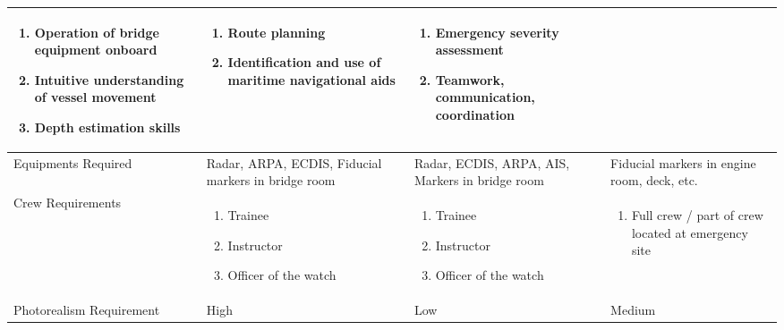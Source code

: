 \begin{table}[h]
\begin{tabular}{@{}p{2.2cm}|p{3.8cm}p{3.2cm}p{3.2cm}@{}}
\begin{enumerate}[nosep,leftmargin=*,topsep=0pt,partopsep=0pt,align=left,itemsep=0cm]
\item Operation of bridge equipment onboard
\item Intuitive understanding of vessel movement
\item Depth estimation skills 
\end{enumerate}
\vspace{-\baselineskip}
& \vspace{-2mm}\begin{enumerate}[nosep,leftmargin=*,topsep=0pt,partopsep=0pt,align=left,itemsep=0cm]
\item Route planning
\item Identification and use of maritime navigational aids
\end{enumerate}
& \vspace{-2mm}\begin{enumerate}[nosep,leftmargin=*,topsep=0pt,partopsep=0pt,align=left,itemsep=0cm]
\item Emergency severity assessment 
\item Teamwork, communication, coordination 
\end{enumerate} \vspace{-\baselineskip} \\
\hline
Equipments Required & Radar, ARPA, ECDIS, Fiducial markers in bridge room & Radar, ECDIS, ARPA, AIS, Markers in bridge room & Fiducial markers in engine room, deck, etc. \\
\hline
Crew Requirements & 
\vspace{-2mm} \begin{enumerate}[nosep,leftmargin=*,topsep=0pt,partopsep=0pt,align=left,itemsep=0cm]
\item Trainee 
\item Instructor
\item Officer of the watch
\end{enumerate}
&\vspace{-2mm} \begin{enumerate}[nosep,leftmargin=*,topsep=0pt,partopsep=0pt,align=left,itemsep=0cm]
\item Trainee 
\item Instructor
\item Officer of the watch
\end{enumerate}
& \vspace{-2mm} \begin{enumerate}[nosep,leftmargin=*,topsep=0pt,partopsep=0pt,align=left,itemsep=0cm]
\item Full crew / part of crew located at emergency site
\end{enumerate} \vspace{-\baselineskip} \\
\hline
Photorealism Requirement & High & Low & Medium \\
\bottomrule
\end{tabular}
\end{table}
